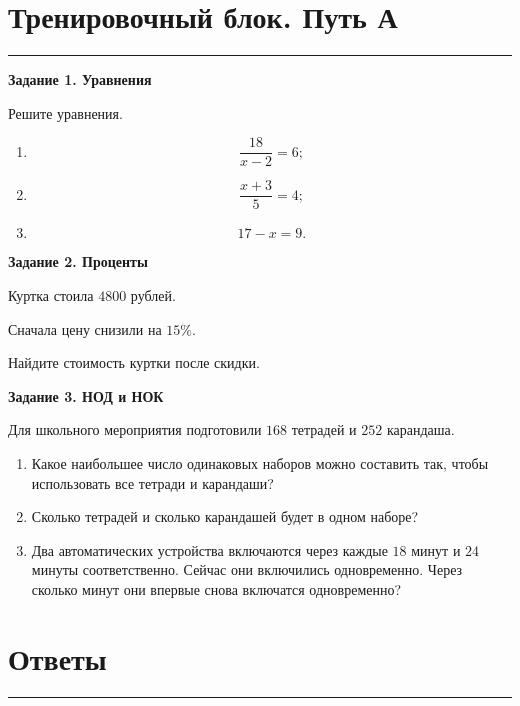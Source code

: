 \documentclass[a4paper,12pt]{article}
\newcommand{\sectionline}{%
    \par\vspace{2mm}
    {\color{accent}\rule{\linewidth}{0.7pt}}
    \vspace{2mm}
}
\begin{document}
\section*{\color{darkaccent}Тренировочный блок. Путь А}
\sectionline

\textbf{Задание 1. Уравнения}

Решите уравнения.

\begin{enumerate}[label=\alph*)]
    \item
    \[
        \frac{18}{x-2}=6;
    \]

    \item
    \[
        \frac{x+3}{5}=4;
    \]

    \item
    \[
        17-x=9.
    \]
\end{enumerate}

\vspace{7mm}

\textbf{Задание 2. Проценты}

Куртка стоила \(4800\) рублей.

Сначала цену снизили на \(15\%\).

Найдите стоимость куртки после скидки.

\vspace{7mm}

\textbf{Задание 3. НОД и НОК}

Для школьного мероприятия подготовили \(168\) тетрадей и \(252\) карандаша.

\begin{enumerate}[label=\alph*)]
    \item Какое наибольшее число одинаковых наборов можно составить так, чтобы использовать все тетради и карандаши?

    \item Сколько тетрадей и сколько карандашей будет в одном наборе?

    \item Два автоматических устройства включаются через каждые \(18\) минут и \(24\) минуты соответственно. Сейчас они включились одновременно. Через сколько минут они впервые снова включатся одновременно?
\end{enumerate}

\clearpage

\section*{\color{darkaccent}Ответы}
\sectionline
\end{document}
